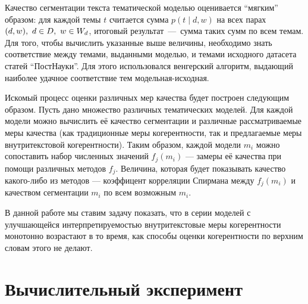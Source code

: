 Качество сегментации текста тематической моделью оценивается ``мягким'' образом: для каждой темы $t$ считается сумма $p(t \mid d, w)$ на всех парах $(d, w),\ d \hm\in D,\ w \hm\in W_d$, итоговый результат~---~сумма таких сумм по всем темам. Для того, чтобы вычислить указанные выше величины, необходимо знать соответствие между темами, выданными моделью, и темами исходного датасета статей ``ПостНауки''. Для этого использовался венгерский алгоритм, выдающий наиболее удачное соответствие тем модельная-исходная.

Искомый процесс оценки различных мер качества будет построен следующим образом. Пусть дано множество различных тематических моделей. Для каждой модели можно вычислить её качество сегментации и различные рассматриваемые меры качества (как традиционные меры когерентности, так и предлагаемые меры внутритекстовой когерентности). Таким образом, каждой модели $m_i$ можно сопоставить набор численных значений $f_j(m_i)$ --- замеры её качества при помощи различных методов $f_j$. Величина, которая будет показывать качество какого-либо из методов --- коэффицент корреляции Спирмана между $f_j(m_i)$ и качеством сегментации $m_i$ по всем возможным $m_i$.

В данной работе мы ставим задачу показать, что в серии моделей с улучшающейся интерпретируемостью внутритекстовые меры когерентности монотонно возрастают в то время, как способы оценки когерентности по верхним словам этого не делают.

\section{Вычислительный эксперимент}

